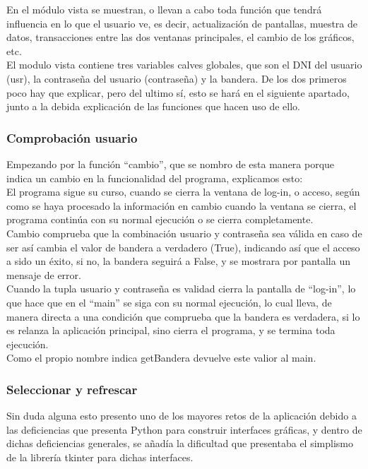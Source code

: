 En el módulo vista se muestran, o llevan a cabo toda función que tendrá influencia en lo que el usuario ve, es decir, actualización de pantallas, muestra de datos, transacciones entre las dos ventanas principales, el cambio de los gráficos, etc.\\

El modulo vista contiene tres variables calves globales, que son el DNI del usuario (usr), la contraseña del usuario (contraseña) y la bandera. De los dos primeros poco hay que explicar, pero del ultimo sí, esto se hará en el siguiente apartado, junto a la debida explicación de las funciones que hacen uso de ello.\\
\subsubsection{Comprobación usuario}
Empezando por la función “cambio”, que se nombro de esta manera porque indica un cambio en la funcionalidad del programa, explicamos esto:\\
El programa sigue su curso, cuando se cierra la ventana de log-in, o acceso, según como se haya procesado la información en cambio cuando la ventana se cierra, el programa continúa con su normal ejecución o se cierra completamente.\\

Cambio comprueba que la combinación usuario y contraseña sea válida en caso de ser así cambia el valor de bandera a verdadero (True), indicando así que el acceso a sido un éxito, si no, la bandera seguirá a False, y se mostrara por pantalla un mensaje de error.\\

Cuando la tupla usuario y contraseña es validad cierra la pantalla de “log-in”, lo que hace que en el “main” se siga con su normal ejecución, lo cual lleva, de manera directa a una condición que comprueba que la bandera es verdadera, si lo es relanza la aplicación principal, sino cierra el programa, y se termina toda ejecución.\\

Como el propio nombre indica getBandera devuelve este valior al main.\\

\subsubsection{Seleccionar y refrescar}
Sin duda alguna esto presento uno de los mayores retos de la aplicación debido a las deficiencias que presenta Python para construir interfaces gráficas, y dentro de dichas deficiencias generales, se añadía la dificultad que presentaba el simplismo de la librería tkinter para dichas interfaces.\\

